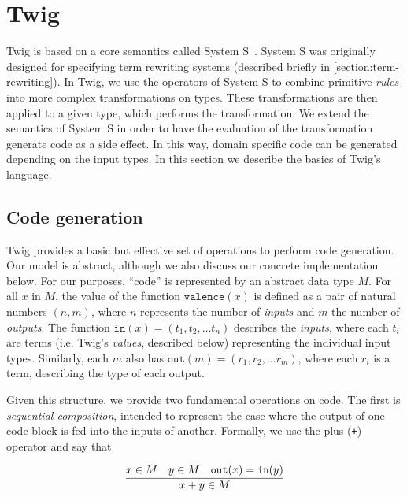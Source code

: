 
\section{Twig}


Twig is based on a core semantics called System S~\cite{Visser:1998p333}.
System S was originally designed for specifying term rewriting systems
(described briefly in \ref{section:term-rewriting}). In Twig, we use the
operators of System S to combine primitive \emph{rules} into more complex
transformations on types. These transformations are then applied to a given
type, which performs the transformation. We extend the semantics of System S
in order to have the evaluation of the transformation generate code as a side
effect. In this way, domain specific code can be generated depending on the
input types. In this section we describe the basics of Twig's language.

\subsection{Code generation}

Twig provides a basic but effective set of operations to perform code
generation. Our model is abstract, although we also discuss our concrete
implementation below. For our purposes, ``code'' is represented by an abstract
data type $M$. For all $x$ in $M$, the value of the function
$\mathtt{valence}(x)$ is defined as a pair of natural numbers $(n,m)$, where
$n$ represents the number of \emph{inputs} and $m$ the number of
\emph{outputs}. The function $\mathtt{in}(x) = (t_1,t_2, \hdots t_n)$
describes the \emph{inputs}, where each $t_i$ are terms (i.e. Twig's
\emph{values}, described below) representing the individual input types.
Similarly, each $m$ also has $\mathtt{out}(m) = (r_1,r_2, \hdots r_m)$, where
each $r_i$ is a term, describing the type of each output.

Given this structure, we provide two fundamental operations on code. The first
is \emph{sequential composition}, intended to represent the case where the
output of one code block is fed into the inputs of another. Formally,
we use the plus (\texttt{+}) operator and say that

\[
\infer
{x+y \in M}
{x \in M \quad y \in M \quad \mathtt{out}(x) = \mathtt{in}(y)}
\]

